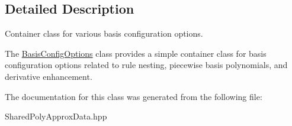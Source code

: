 \subsection{Detailed Description}
Container class for various basis configuration options. 

The \hyperlink{classPecos_1_1BasisConfigOptions}{Basis\+Config\+Options} class provides a simple container class for basis configuration options related to rule nesting, piecewise basis polynomials, and derivative enhancement. 

The documentation for this class was generated from the following file\+:\begin{DoxyCompactItemize}
\item 
Shared\+Poly\+Approx\+Data.\+hpp\end{DoxyCompactItemize}
